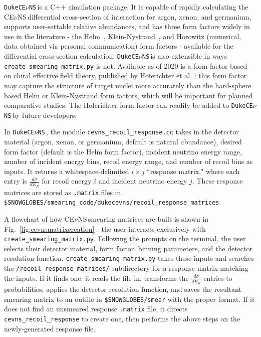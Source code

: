 \documentclass{article}
\newcommand{\cev}{CE$\nu$NS\,}
\newcommand{\dukecev}{\texttt{DukeCE$\nu$NS}\,}
\begin{document}
\dukecev is a C++ simulation package. It is capable of rapidly calculating the \cev differential cross-section of interaction for argon, xenon, and germanium, supports user-settable relative abundances, and has three form factors widely in use in the literature - the Helm~\cite{lewin_review_1996}, Klein-Nystrand~\cite{klein_exclusive_1999}, and Horowitz (numerical, data obtained via personal communication) form factors - available for the differential cross-section calculation. \dukecev is also extensible in ways \texttt{create\_smearing\_matrix.py} is not. Available as of 2020 is a form factor based on chiral effective field theory, published by Hoferichter et al. \cite{Hoferichter_2020}; this form factor may capture the structure of target nuclei more accurately than the hard-sphere based Helm or Klein-Nystrand form factors, which will be important for planned comparative studies. The Hoferichter form factor can readily be added to \dukecev by future developers.

In \dukecev, the module \texttt{cevns\_recoil\_response.cc} takes in the detector material (argon, xenon, or germanium, default is natural abundance), desired form factor (default is the Helm form factor), incident neutrino energy range, number of incident energy bins, recoil energy range, and number of recoil bins as inputs. It returns a whitespace-delimited $i \times j$ ``response matrix," where each entry is $\frac{d\sigma}{dE_R}$ for recoil energy $i$ and incident neutrino energy $j$. These response matrices are stored as \texttt{.matrix} files in \texttt{\$SNOWGLOBES/smearing\_code/dukecevns/recoil\_response\_matrices}.

A flowchart of how \cev smearing matrices are built is shown in Fig.~\ref{fig:cevnsmatrixcreation} -  the user interacts exclusively with \texttt{create\_smearing\_matrix.py}. Following the prompts on the terminal, the user selects their detector material, form factor, binning parameters, and the detector resolution function. \texttt{create\_smearing\_matrix.py} takes these inputs and searches the \texttt{/recoil\_response\_matrices/} subdirectory for a response matrix matching the inputs. If it finds one, it reads the file in, transforms the $\frac{d\sigma}{dE_R}$ entries to probabilities, applies the detector resolution function, and saves the resultant smearing matrix to an outfile in \texttt{\$SNOWGLOBES/smear} with the proper format. If it does not find an unsmeared response \texttt{.matrix} file, it directs \texttt{cevns\_recoil\_response} to create one, then performs the above steps on the newly-generated response file.
\end{document}
